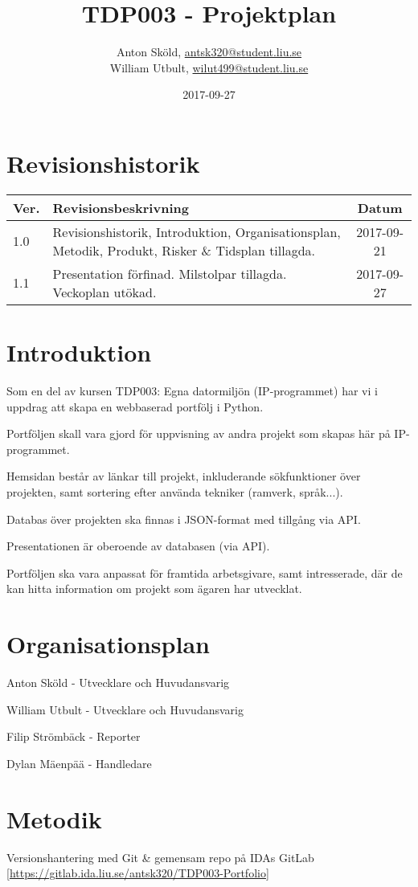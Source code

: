 \documentclass{TDP003mall}
\author{Anton Sköld, \href{mailto:antsk320@student.liu.se}{antsk320@student.liu.se}\\
William Utbult, \href{mailto:wilut499@student.liu.se}{wilut499@student.liu.se}}
\title{TDP003 - Projektplan}
\date{2017-09-27}
\begin{document}
\projectpage
\tableofcontents

\section{Revisionshistorik}
  \begin{table}[!h]
    \begin{tabularx}{\linewidth}{|l|X|c|}
    \hline
    Ver. & Revisionsbeskrivning & Datum \\
    \hline
    1.0 & Revisionshistorik, Introduktion, Organisationsplan, Metodik, Produkt, Risker \& Tidsplan tillagda. & 2017-09-21\\
    \hline
    1.1 & Presentation förfinad. Milstolpar tillagda. Veckoplan utökad. & 2017-09-27\\
    \hline
    \end{tabularx}
  \end{table}

\section{Introduktion}
  Som en del av kursen TDP003: Egna datormiljön (IP-programmet) har vi i uppdrag att skapa en webbaserad portfölj i Python.

  Portföljen skall vara gjord för uppvisning av andra projekt som skapas här på IP-programmet.

  Hemsidan består av länkar till projekt, inkluderande sökfunktioner över projekten, samt sortering efter använda tekniker (ramverk, språk...).

  Databas över projekten ska finnas i JSON-format med tillgång via API.

  Presentationen är oberoende av databasen (via API).

  Portföljen ska vara anpassat för framtida arbetsgivare, samt intresserade, där de kan hitta information om projekt som ägaren har utvecklat.

\section{Organisationsplan}
  Anton Sköld - Utvecklare och Huvudansvarig

  William Utbult - Utvecklare och Huvudansvarig

  Filip Strömbäck - Reporter

  Dylan Mäenpää - Handledare

\section{Metodik}
  Versionshantering med Git \& gemensam repo på IDAs GitLab [\url{https://gitlab.ida.liu.se/antsk320/TDP003-Portfolio}]
\end{document}
